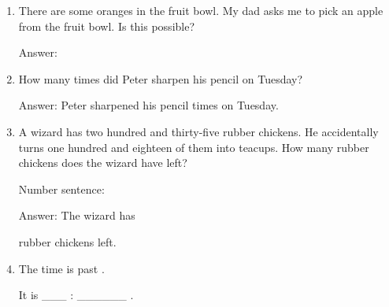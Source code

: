 \documentclass{tufte-book}
\begin{document}
\begin{enumerate}
\item There are some oranges in the fruit bowl. My dad asks me to pick an apple from the fruit bowl. Is this possible?\medskip\par
Answer: \dotfill\medskip

\item {}
How many times did Peter sharpen his pencil on Tuesday?\bigskip\par
Answer: Peter sharpened his pencil \dotfill\bigskip times on Tuesday.

\item A wizard has two hundred and thirty-five rubber chickens. He accidentally turns one hundred and eighteen of them into teacups. How many rubber chickens does the wizard have left?\medskip\par
Number sentence: \dotfill\medskip\par
Answer: The wizard has 
\dotfill\medskip\par\mbox{}\dotfill\medskip\par\mbox{}\dotfill\bigskip
 rubber chickens left.

\item {}
The time is \dotfill past \dotfill\bigskip.\par
It is \_\_\_ : \_\_\_\_\_\_ . \bigskip\par

\end{enumerate}
\end{document}
